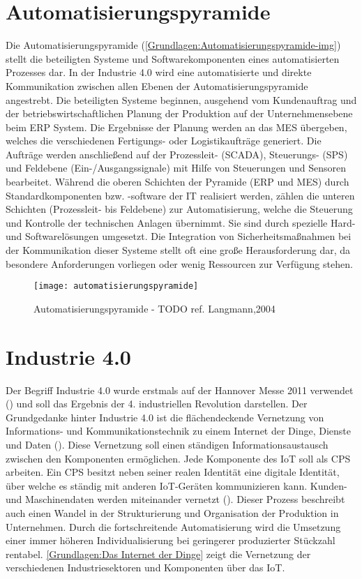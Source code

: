 \clearpage

\section{Automatisierungspyramide}
\label{Grundlagen:Automatisierungspyramide}
Die Automatisierungspyramide (\autoref{Grundlagen:Automatisierungspyramide-img}) stellt die beteiligten Systeme und Softwarekomponenten eines automatisierten Prozesses dar. In der Industrie 4.0 wird eine automatisierte und direkte Kommunikation zwischen allen Ebenen der Automatisierungspyramide angestrebt. Die beteiligten Systeme beginnen, ausgehend vom Kundenauftrag und der betriebswirtschaftlichen Planung der Produktion auf der Unternehmensebene beim \ac{ERP} System. Die Ergebnisse der Planung werden an das \ac{MES} übergeben, welches die verschiedenen Fertigungs- oder Logistikaufträge generiert. Die Aufträge werden anschließend auf der Prozessleit- (\ac{SCADA}), Steuerungs- (\ac{SPS}) und Feldebene (Ein-/Ausgangssignale) mit Hilfe von Steuerungen und Sensoren bearbeitet. Während die oberen Schichten der Pyramide (\ac{ERP} und \ac{MES}) durch Standardkomponenten bzw. -software der IT realisiert werden, zählen die unteren Schichten (Prozessleit- bis Feldebene) zur Automatisierung, welche die Steuerung und Kontrolle der technischen Anlagen übernimmt. Sie sind durch spezielle Hard- und Softwarelösungen umgesetzt. Die Integration von Sicherheitsmaßnahmen bei der Kommunikation dieser Systeme stellt oft eine große Herausforderung dar, da besondere Anforderungen vorliegen oder wenig Ressourcen zur Verfügung stehen.

\begin{figure}[h]
  \centering
  \texttt{[image: automatisierungspyramide]}
  \caption{Automatisierungspyramide - TODO ref. Langmann,2004}
  \label{Grundlagen:Automatisierungspyramide-img}
\end{figure}

\clearpage

\section{Industrie 4.0}
Der Begriff Industrie 4.0 wurde erstmals auf der Hannover Messe 2011 verwendet (\cite{drath2014}) und soll das Ergebnis der 4. industriellen Revolution darstellen. Der Grundgedanke hinter Industrie 4.0 ist die flächendeckende Vernetzung von Informations- und Kommunikationstechnik zu einem Internet der Dinge, Dienste und Daten (\cite{Spath2013}). Diese Vernetzung soll einen ständigen Informationsaustausch zwischen den Komponenten ermöglichen. Jede Komponente des \ac{IoT} soll als \ac{CPS} arbeiten. Ein \ac{CPS} besitzt neben seiner realen Identität eine digitale Identität, über welche es ständig mit anderen \ac{IoT}-Geräten kommunizieren kann. Kunden- und Maschinendaten werden miteinander vernetzt (\cite{rami2016}). Dieser Prozess beschreibt auch einen Wandel in der Strukturierung und Organisation der Produktion in Unternehmen. Durch die fortschreitende Automatisierung wird die Umsetzung einer immer höheren Individualisierung bei geringerer produzierter Stückzahl rentabel. \autoref{Grundlagen:Das Internet der Dinge} zeigt die Vernetzung der verschiedenen Industriesektoren und Komponenten über das \ac{IoT}.

